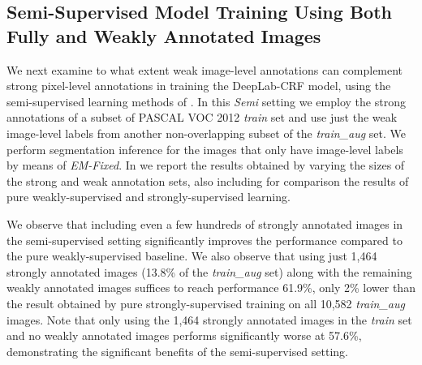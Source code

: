 

\subsection{Semi-Supervised Model Training Using Both Fully and Weakly Annotated Images}
\label{sec:test_semi}

We next examine to what extent weak image-level annotations can
complement strong pixel-level annotations in training the DeepLab-CRF
model, using the semi-supervised learning methods of
. In this \textsl{Semi} setting we employ the
strong annotations of a subset of PASCAL VOC 2012 \textsl{train} set
and use just the weak image-level labels from another non-overlapping
subset of the \textsl{train\_aug} set. We perform segmentation
inference for the images that only have image-level labels by means of
\textsl{EM-Fixed}. In  we report the 
results obtained by varying the sizes of the strong and weak
annotation sets, also including for comparison the results of pure
weakly-supervised and strongly-supervised learning.

We observe that including even a few hundreds of strongly annotated
images in the semi-supervised setting significantly improves the 
performance compared to the pure weakly-supervised baseline. We also
observe that using just 1,464 strongly annotated images (13.8\% of the
\textsl{train\_aug} set) along with the remaining weakly annotated
images suffices to reach performance 61.9\%, only 2\% lower than the
result obtained by pure strongly-supervised training on all 10,582
\textsl{train\_aug} images. Note that only using the 1,464 strongly
annotated images in the \textsl{train} set and no weakly annotated
images performs significantly worse at 57.6\%, demonstrating the
significant benefits of the semi-supervised setting.

